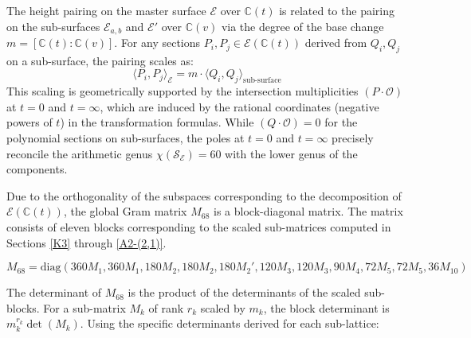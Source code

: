 \documentclass[11pt]{amsart}
\numberwithin{equation}{section}
\numberwithin{table}{section}
\newcommand\<{\langle}
\begin{document}
The height pairing on the master surface $\mathcal{E}$ over $\mathbb{C}(t)$ is related to the pairing on the sub-surfaces $\mathcal{E}_{a,b}$ and $\mathcal{E}'$ over $\mathbb{C}(v)$ via the degree of the base change $m = [\mathbb{C}(t) : \mathbb{C}(v)]$. For any sections $P_i, P_j \in \mathcal{E}(\mathbb{C}(t))$ derived from $Q_i, Q_j$ on a sub-surface, the pairing scales as:
\begin{equation}
	\langle P_i, P_j \rangle_{\mathcal{E}} = m \cdot \langle Q_i, Q_j \rangle_{\text{sub-surface}}
\end{equation}
This scaling is geometrically supported by the intersection multiplicities $(P \cdot \mathcal{O})$ at $t=0$ and $t=\infty$, which are induced by the rational coordinates (negative powers of $t$) in the transformation formulas. While $(Q \cdot \mathcal{O}) = 0$ for the polynomial sections on sub-surfaces, the poles at $t=0$ and $t=\infty$ precisely reconcile the arithmetic genus $\chi(\mathcal{S}_{\mathcal{E}}) = 60$ with the lower genus of the components.


Due to the orthogonality of the subspaces corresponding to the decomposition of $\mathcal{E}(\mathbb{C}(t))$, the global Gram matrix $M_{68}$ is a block-diagonal matrix. The matrix consists of eleven blocks corresponding to the scaled sub-matrices computed in Sections \ref{K3}  through \ref{A2-(2,1)}.



\begin{equation}
M_{68} = \text{diag}\left( 360 M_1, 360 M_1, 180 M_2, 180 M_2, 180 M_2', 120 M_3, 120 M_3, 90 M_4, 72 M_5, 72 M_5, 36 M_{10} \right)
\end{equation}


The determinant of $M_{68}$ is the product of the determinants of the scaled sub-blocks. For a sub-matrix $M_k$ of rank $r_k$ scaled by $m_k$, the block determinant is $m_k^{r_k} \det(M_k)$. Using the specific determinants derived for each sub-lattice:
\end{document}

